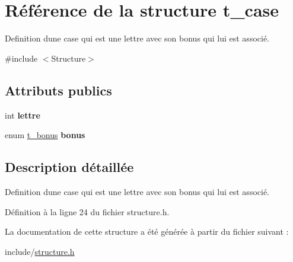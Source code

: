 \hypertarget{structt__case}{}\section{Référence de la structure t\+\_\+case}
\label{structt__case}


Definition d\textquotesingle{}une case qui est une lettre avec son bonus qui lui est associé.  




{\ttfamily \#include $<$Structure$>$}

\subsection*{Attributs publics}
\begin{DoxyCompactItemize}
\item 
\hypertarget{structt__case_a38245c7046b2e01295c369509a87ab1b}{}int {\bfseries lettre}\label{structt__case_a38245c7046b2e01295c369509a87ab1b}

\item 
\hypertarget{structt__case_a5648b98d34144d64dfc9ff8397159db5}{}enum \hyperlink{structure_8h_a4dfb649c60c07e69175f04af6e69d33e}{t\+\_\+bonus} {\bfseries bonus}\label{structt__case_a5648b98d34144d64dfc9ff8397159db5}

\end{DoxyCompactItemize}


\subsection{Description détaillée}
Definition d\textquotesingle{}une case qui est une lettre avec son bonus qui lui est associé. 

Définition à la ligne 24 du fichier structure.\+h.



La documentation de cette structure a été générée à partir du fichier suivant \+:\begin{DoxyCompactItemize}
\item 
include/\hyperlink{structure_8h}{structure.\+h}\end{DoxyCompactItemize}
